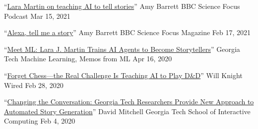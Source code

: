 {\color{black}\fontsize{12pt}{1em}} 






  \cvmedia
    {``\href{https://www.sciencefocus.com/future-technology/lara-martin-on-teaching-ai-to-tell-stories/}{Lara Martin on teaching AI to tell stories}''} %
    {Amy Barrett} %
    {BBC Science Focus Podcast} %
    {Mar 15, 2021} %

  \cvmedia
    {``\href{https://www.sciencefocus.com/magazine/dark-stars/}{Alexa, tell me a story}''} %
    {Amy Barrett} %
    {BBC Science Focus Magazine} %
    {Feb 17, 2021} %

  \cvmedia
    {``\href{https://mlatgt.blog/2020/04/16/meet-mlgt-lara-j-martin-trains-ai-agents-to-become-storytellers/}{Meet ML\@GT: Lara J. Martin Trains AI Agents to Become Storytellers}''} %
    {} %
    {Georgia Tech Machine Learning, Memos from ML\@GT} %
    {Apr 16, 2020} %

  \cvmedia
    {``\href{https://www.wired.com/story/forget-chess-real-challenge-teaching-ai-play-dandd/}{Forget Chess---the Real Challenge Is Teaching AI to Play D\&D}''} %
    {Will Knight} %
    {Wired} %
    {Feb 28, 2020} %

  \cvmedia
    {``\href{https://www.ic.gatech.edu/news/632082/changing-conversation-georgia-tech-researchers-provide-new-approach-automated-story}{Changing the Conversation: Georgia Tech Researchers Provide New Approach to Automated Story Generation}''} %
    {David Mitchell} %
    {Georgia Tech School of Interactive Computing} %
    {Feb 4, 2020} %

